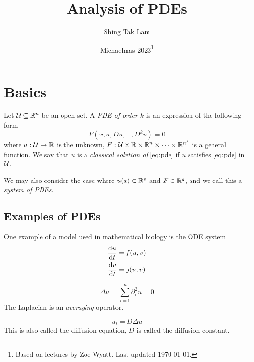 \documentclass{article}
\title{Analysis of PDEs}
\author{Shing Tak Lam}
\date{Michaelmas 2023\footnote{Based on lectures by Zoe Wyatt. Last updated \today.}}
\begin{document}
\maketitle

\tableofcontents


\lec

\section{Basics}

Let \(\mathcal{U} \subseteq \mathbb{R}^n\) be an open set. A \emph{PDE of order \(k\)} is an expression of the following form
\begin{equation}
    \label{eq:pde}
    F(x, u, Du, \dots, D^ku) = 0
\end{equation}
where \(u : \mathcal{U} \to \mathbb{R}\) is the unknown, \(F : \mathcal{U} \times \mathbb{R} \times \mathbb{R}^n \times \cdots \times \mathbb{R}^{n^k}\) is a general function. We say that \(u\) is a \emph{classical solution of} \cref{eq:pde} if \(u\) satisfies \cref{eq:pde} in \(\mathcal{U}\).

We may also consider the case where \(u(x) \in \mathbb{R}^p\) and \(F \in \mathbb{R}^q\), and we call this a \emph{system of PDEs}.

\subsection{Examples of PDEs}

\begin{example}
    One example of a model used in mathematical biology is the ODE system
    \begin{align*}
        \dv{u}{t} &= f(u, v) \\
        \dv{v}{t} &= g(u, v)
    \end{align*}
\end{example}

\begin{example}
    \[\Delta u = \sum_{i=1}^n \partial_i^2 u = 0\]
    The Laplacian is an \emph{averaging} operator.
\end{example}

\begin{example}
    \[u_t = D\Delta u\]
    This is also called the diffusion equation, \(D\) is called the diffusion constant.
\end{example}
\end{document}
